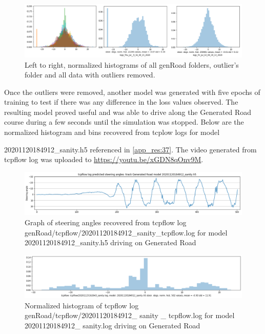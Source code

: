 \begin{figure}[h!]
\centering
\includegraphics[width=\textwidth]{Figures/SkewCleanup.png}
\caption{Left to right, normalized histograms of all genRoad folders, outlier's folder and all data with outliers removed.}
\label{fig:SkewCleanup}
\end{figure}

Once the outliers were removed, another model was generated with five epochs of training to test if there was any difference in the loss values observed. The resulting model proved useful and was able to drive along the Generated Road course during a few seconds until the simulation was stopped. Below are the normalized histogram and bins recovered from tcplow logs for model  
  
20201120184912\_sanity.h5 referenced in \ref{app_res:37}. The video generated from tcpflow log was uploaded to \href{https://youtu.be/xGDN8qOnv9M}{https://youtu.be/xGDN8qOnv9M}.

\begin{figure}[ht]
 \centering 
 \includegraphics[width=\textwidth]{Figures/tcpflow_20201120184912_sanity_graph.png}
 \caption{Graph of steering angles recovered from tcpflow log genRoad/tcpflow/20201120184912\_sanity\_tcpflow.log for model 20201120184912\_sanity.h5 driving on Generated Road}
 \label{fig:tcpflow_20201120184912_graph}
\end{figure}

\begin{figure}[ht]
 \centering 
 \includegraphics[width=\textwidth]{Figures/tcpflow_20201120184912_sanity_bins.png}
 \caption{Normalized histogram of tcpflow log genRoad/tcpflow/20201120184912\_ sanity \_ tcpflow.log for model 20201120184912\_ sanity.log driving on Generated Road}
 \label{fig:tcpflow_20201120184912_bins} 
\end{figure}

